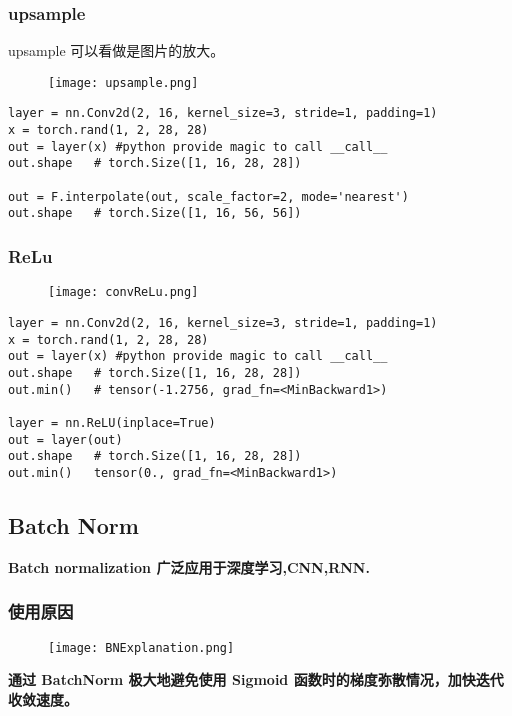 \subsubsection{upsample}
upsample 可以看做是图片的放大。
\begin{figure}[!h]
  \centering
  \texttt{[image: upsample.png]}
\end{figure}

\begin{lstlisting}
layer = nn.Conv2d(2, 16, kernel_size=3, stride=1, padding=1)
x = torch.rand(1, 2, 28, 28)
out = layer(x) #python provide magic to call __call__
out.shape   # torch.Size([1, 16, 28, 28])

out = F.interpolate(out, scale_factor=2, mode='nearest')
out.shape   # torch.Size([1, 16, 56, 56])
\end{lstlisting}


\subsubsection{ReLu}
\begin{figure}[!h]
  \centering
  \texttt{[image: convReLu.png]}
\end{figure}

\begin{lstlisting}
layer = nn.Conv2d(2, 16, kernel_size=3, stride=1, padding=1)
x = torch.rand(1, 2, 28, 28)
out = layer(x) #python provide magic to call __call__
out.shape   # torch.Size([1, 16, 28, 28])
out.min()   # tensor(-1.2756, grad_fn=<MinBackward1>)

layer = nn.ReLU(inplace=True)
out = layer(out)   
out.shape   # torch.Size([1, 16, 28, 28])
out.min()   tensor(0., grad_fn=<MinBackward1>)
\end{lstlisting}

\subsection{Batch Norm}
\textbf{Batch normalization 广泛应用于深度学习,CNN,RNN.}
\subsubsection{使用原因}
\begin{figure}[!h]
  \centering
  \texttt{[image: BNExplanation.png]}
\end{figure}

\textbf{通过 BatchNorm 极大地避免使用 Sigmoid 函数时的梯度弥散情况，加快迭代收敛速度。}

